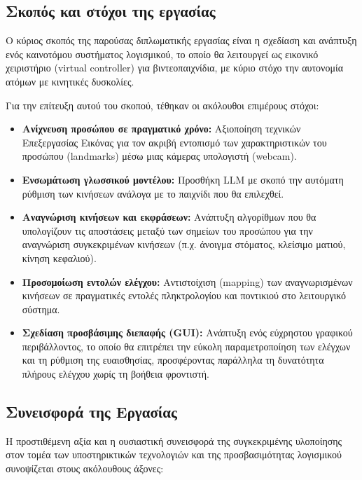 \documentclass[twoside, a4paper, 11pt]{article}
\begin{document}
\subsection{Σκοπός και στόχοι της εργασίας}
Ο κύριος σκοπός της παρούσας διπλωματικής εργασίας είναι η σχεδίαση και ανάπτυξη ενός καινοτόμου
συστήματος λογισμικού, το οποίο θα λειτουργεί ως εικονικό χειριστήριο (virtual controller) για βιντεοπαιχνίδια, με κύριο στόχο την αυτονομία ατόμων με κινητικές δυσκολίες.

Για την επίτευξη αυτού του σκοπού, τέθηκαν οι ακόλουθοι επιμέρους στόχοι:
\begin{itemize}
    \item \textbf{Ανίχνευση προσώπου σε πραγματικό χρόνο:} Αξιοποίηση τεχνικών Επεξεργασίας Εικόνας για τον ακριβή εντοπισμό των χαρακτηριστικών του προσώπου (landmarks) μέσω μιας κάμερας υπολογιστή (webcam).
    \item \textbf{Ενσωμάτωση γλωσσικού μοντέλου:} Προσθήκη LLM με σκοπό την αυτόματη ρύθμιση των κινήσεων ανάλογα με το παιχνίδι που θα επιλεχθεί.
    \item \textbf{Αναγνώριση κινήσεων και εκφράσεων:} Ανάπτυξη αλγορίθμων που θα υπολογίζουν τις αποστάσεις μεταξύ των σημείων του προσώπου για την αναγνώριση συγκεκριμένων κινήσεων (π.χ. άνοιγμα στόματος, κλείσιμο ματιού, κίνηση κεφαλιού).
    \item \textbf{Προσομοίωση εντολών ελέγχου:} Αντιστοίχιση (mapping) των αναγνωρισμένων κινήσεων σε πραγματικές εντολές πληκτρολογίου και ποντικιού στο λειτουργικό σύστημα.
    \item \textbf{Σχεδίαση προσβάσιμης διεπαφής (GUI):} Ανάπτυξη ενός εύχρηστου γραφικού περιβάλλοντος, το οποίο θα επιτρέπει την εύκολη παραμετροποίηση των ελέγχων και τη ρύθμιση της ευαισθησίας, προσφέροντας παράλληλα τη δυνατότητα πλήρους ελέγχου χωρίς τη βοήθεια φροντιστή.
\end{itemize}

\subsection{Συνεισφορά της Εργασίας}

Η προστιθέμενη αξία και η ουσιαστική συνεισφορά της συγκεκριμένης υλοποίησης στον τομέα των υποστηρικτικών τεχνολογιών και της προσβασιμότητας λογισμικού συνοψίζεται στους ακόλουθους άξονες:
\end{document}
